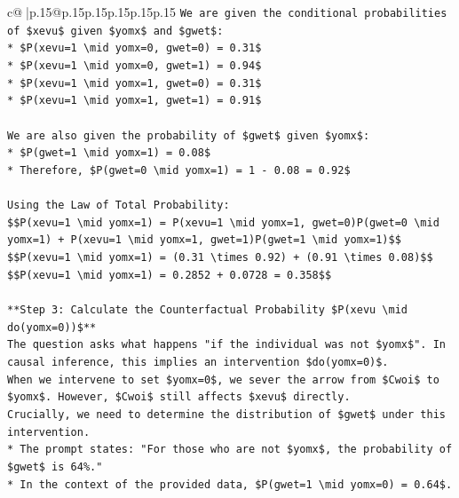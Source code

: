 \documentclass{article}
\begin{document}
{\begin{supertabular}{c@{$\;$}|p{.15\linewidth}@{}p{.15\linewidth}p{.15\linewidth}p{.15\linewidth}p{.15\linewidth}p{.15\linewidth}}
{{{\texttt{We are given the conditional probabilities of \$xevu\$ given \$yomx\$ and \$gwet\$:} \\
\texttt{*   \$P(xevu=1 \textbackslash{}mid yomx=0, gwet=0) = 0.31\$} \\
\texttt{*   \$P(xevu=1 \textbackslash{}mid yomx=0, gwet=1) = 0.94\$} \\
\texttt{*   \$P(xevu=1 \textbackslash{}mid yomx=1, gwet=0) = 0.31\$} \\
\texttt{*   \$P(xevu=1 \textbackslash{}mid yomx=1, gwet=1) = 0.91\$} \\
\\ 
\texttt{We are also given the probability of \$gwet\$ given \$yomx\$:} \\
\texttt{*   \$P(gwet=1 \textbackslash{}mid yomx=1) = 0.08\$} \\
\texttt{*   Therefore, \$P(gwet=0 \textbackslash{}mid yomx=1) = 1 {-} 0.08 = 0.92\$} \\
\\ 
\texttt{Using the Law of Total Probability:} \\
\texttt{\$\$P(xevu=1 \textbackslash{}mid yomx=1) = P(xevu=1 \textbackslash{}mid yomx=1, gwet=0)P(gwet=0 \textbackslash{}mid yomx=1) + P(xevu=1 \textbackslash{}mid yomx=1, gwet=1)P(gwet=1 \textbackslash{}mid yomx=1)\$\$} \\
\texttt{\$\$P(xevu=1 \textbackslash{}mid yomx=1) = (0.31 \textbackslash{}times 0.92) + (0.91 \textbackslash{}times 0.08)\$\$} \\
\texttt{\$\$P(xevu=1 \textbackslash{}mid yomx=1) = 0.2852 + 0.0728 = 0.358\$\$} \\
\\ 
\texttt{**Step 3: Calculate the Counterfactual Probability \$P(xevu \textbackslash{}mid do(yomx=0))\$**} \\
\texttt{The question asks what happens "if the individual was not \$yomx\$". In causal inference, this implies an intervention \$do(yomx=0)\$.} \\
\texttt{When we intervene to set \$yomx=0\$, we sever the arrow from \$Cwoi\$ to \$yomx\$. However, \$Cwoi\$ still affects \$xevu\$ directly.} \\
\texttt{Crucially, we need to determine the distribution of \$gwet\$ under this intervention.} \\
\texttt{*   The prompt states: "For those who are not \$yomx\$, the probability of \$gwet\$ is 64\%."} \\
\texttt{*   In the context of the provided data, \$P(gwet=1 \textbackslash{}mid yomx=0) = 0.64\$.} \\
}}}
\end{supertabular}}
\end{document}
